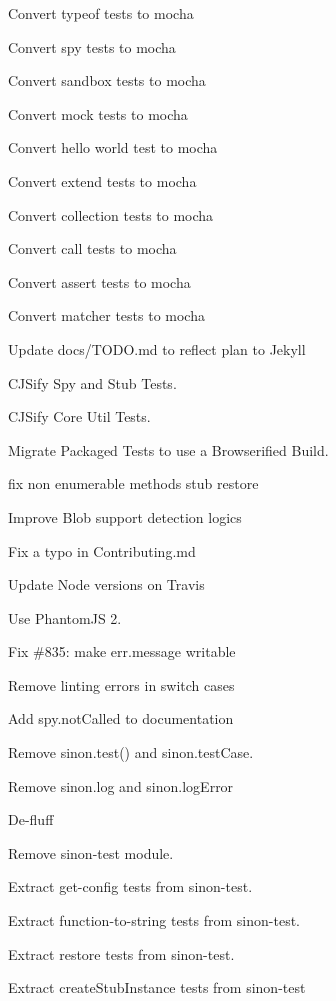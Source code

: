 \begin{DoxyItemize}
\item Convert typeof tests to mocha
\item Convert spy tests to mocha
\item Convert sandbox tests to mocha
\item Convert mock tests to mocha
\item Convert hello world test to mocha
\item Convert extend tests to mocha
\item Convert collection tests to mocha
\item Convert call tests to mocha
\item Convert assert tests to mocha
\item Convert matcher tests to mocha
\item Update docs/\+T\+O\+D\+O.\+md to reflect plan to Jekyll
\item C\+J\+Sify Spy and Stub Tests.
\item C\+J\+Sify Core Util Tests.
\item Migrate Packaged Tests to use a Browserified Build.
\item fix non enumerable methods stub restore
\item Improve Blob support detection logics
\item Fix a typo in Contributing.\+md
\item Update Node versions on Travis
\item Use Phantom\+JS 2.
\item Fix \#835\+: make err.\+message writable
\item Remove linting errors in switch cases
\item Add spy.\+not\+Called to documentation
\item Remove {\ttfamily sinon.\+test()} and {\ttfamily sinon.\+test\+Case}.
\item Remove {\ttfamily sinon.\+log} and {\ttfamily sinon.\+log\+Error}
\item De-\/fluff
\item Remove {\ttfamily sinon-\/test} module.
\item Extract {\ttfamily get-\/config} tests from {\ttfamily sinon-\/test}.
\item Extract {\ttfamily function-\/to-\/string} tests from {\ttfamily sinon-\/test}.
\item Extract {\ttfamily restore} tests from {\ttfamily sinon-\/test}.
\item Extract {\ttfamily create\+Stub\+Instance} tests from {\ttfamily sinon-\/test}

\end{DoxyItemize}
